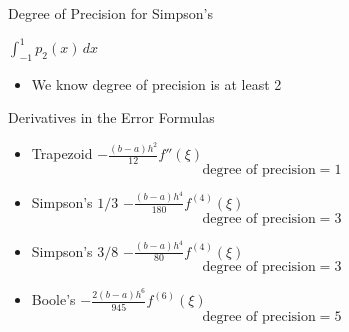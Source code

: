 \documentclass[10pt]{beamer}
\begin{document}
\begin{frame}{Degree of Precision for Simpson's}
{
    $\int_{-1}^{1} p_2(x) \,dx$
    }
    \vspace{5mm}
    \begin{itemize}
        \item We know degree of precision is at least 2
    \end{itemize}
\end{frame}
\begin{frame}{Derivatives in the Error Formulas}

\begin{itemize}
    \item    Trapezoid   $-\frac{(b-a)h^2}{12}f''(\xi)$ 
        $$\text{degree of precision} =1$$
    
    \item Simpson's $1/3$  $-\frac{(b-a)h^4}{180}f^{(4)}(\xi)$ 
        $$\text{degree of precision} =3$$
    \item Simpson's $3/8$  $-\frac{(b-a)h^4}{80}f^{(4)}(\xi)$ 
        $$\text{degree of precision} =3$$
   \item Boole's       $-\frac{2(b-a)h^6}{945}f^{(6)}(\xi)$ 
        $$\text{degree of precision} =5$$
\end{itemize}
    
\end{frame}
\end{document}
